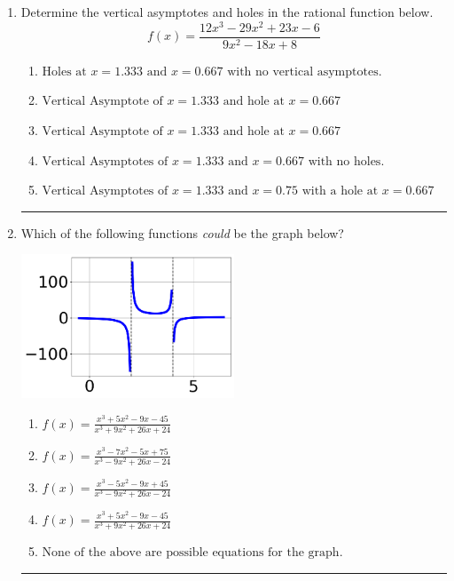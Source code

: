 \documentclass[14pt]{extbook}
\newcommand{\litem}[1]{\item#1\hspace*{-1cm}\rule{\textwidth}{0.4pt}}
\begin{document}
\begin{enumerate}
{\begin{enumerate}[label=\Alph*.]
\end{enumerate} }
\litem{
Determine the vertical asymptotes and holes in the rational function below.\[ f(x) = \frac{12x^{3} -29 x^{2} +23 x -6}{9x^{2} -18 x + 8} \]\begin{enumerate}[label=\Alph*.]
\item \( \text{Holes at } x = 1.333 \text{ and } x = 0.667 \text{ with no vertical asymptotes.} \)
\item \( \text{Vertical Asymptote of } x = 1.333 \text{ and hole at } x = 0.667 \)
\item \( \text{Vertical Asymptote of } x = 1.333 \text{ and hole at } x = 0.667 \)
\item \( \text{Vertical Asymptotes of } x = 1.333 \text{ and } x = 0.667 \text{ with no holes.} \)
\item \( \text{Vertical Asymptotes of } x = 1.333 \text{ and } x = 0.75 \text{ with a hole at } x = 0.667 \)

\end{enumerate} }
\litem{
Which of the following functions \textit{could} be the graph below?
\begin{center}
    \includegraphics[width=0.5\textwidth]{../Figures/identifyGraphOfRationalFunctionB.png}
\end{center}
\begin{enumerate}[label=\Alph*.]
\item \( f(x)=\frac{x^{3} +5 x^{2} -9 x -45}{x^{3} +9 x^{2} +26 x + 24} \)
\item \( f(x)=\frac{x^{3} -7 x^{2} -5 x + 75}{x^{3} -9 x^{2} +26 x -24} \)
\item \( f(x)=\frac{x^{3} -5 x^{2} -9 x + 45}{x^{3} -9 x^{2} +26 x -24} \)
\item \( f(x)=\frac{x^{3} +5 x^{2} -9 x -45}{x^{3} +9 x^{2} +26 x + 24} \)
\item \( \text{None of the above are possible equations for the graph.} \)


\end{enumerate}}
\end{enumerate}
\end{document}
